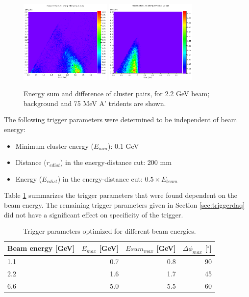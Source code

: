 \begin{figure}[ht]
	\includegraphics[width=0.4\textwidth]{performance/ediff_22}
	\includegraphics[width=0.4\textwidth]{performance/ediff_22_075mev}
	\caption{\small{Energy sum and difference of cluster pairs, for 2.2 GeV beam; background and 75 MeV A' tridents are shown.}}
	\label{fig:ediff}
\end{figure}

The following trigger parameters were determined to be independent of beam energy:
\begin{itemize}
	\item Minimum cluster energy ($E_{min}$): 0.1 GeV
	\item Distance ($r_{edist}$) in the energy-distance cut: 200 mm
	\item Energy ($E_{edist}$) in the energy-distance cut: $0.5\times E_{beam}$
\end{itemize}

Table \ref{tab:trigcuts} summarizes the trigger parameters that were found dependent on the beam energy. 
The remaining trigger parameters given in Section \ref{sec:triggerdaq} did not have a significant 
effect on specificity of the trigger.

\begin{table}
	\begin{tabular}{|l|r|r|r|}
		\hline
		Beam energy [GeV] & $E_{max}$ [GeV] & $Esum_{max}$ [GeV] & $\Delta\phi_{max}$ [$^\circ$] \\
		\hline
		1.1	&	0.7	&	0.8	&	90\\
		2.2	&	1.6	&	1.7	&	45\\
		6.6	&	5.0	&	5.5	&	60\\
		\hline
	\end{tabular}
	\caption{ {\small Trigger parameters optimized for different beam energies.}
	\label{tab:trigcuts}}
\end{table}


